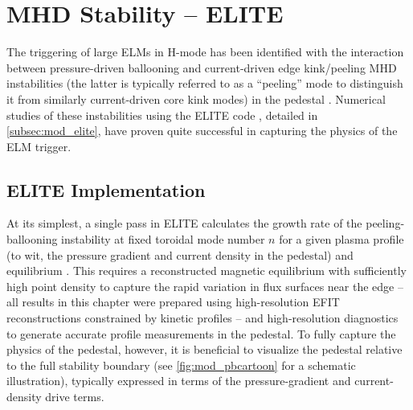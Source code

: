 \section{MHD Stability -- ELITE}\label{sec:imode_elite}

The triggering of large ELMs in H-mode has been identified with the interaction between pressure-driven ballooning and current-driven edge kink/peeling MHD instabilities (the latter is typically referred to as a ``peeling'' mode to distinguish it from similarly current-driven core kink modes) in the pedestal \cite{Wilson2002,Snyder2004,Wilson2006}.  Numerical studies of these instabilities using the ELITE code \cite{Wilson2002,Snyder2003}, detailed in \cref{subsec:mod_elite}, have proven quite successful in capturing the physics of the ELM trigger.

\subsection{ELITE Implementation}\label{subsec:imode_elite_setup}

At its simplest, a single pass in ELITE calculates the growth rate of the peeling-ballooning instability at fixed toroidal mode number $n$ for a given plasma profile (to wit, the pressure gradient and current density in the pedestal) and equilibrium \cite{Snyder2013}.  This requires a reconstructed magnetic equilibrium with sufficiently high point density to capture the rapid variation in flux surfaces near the edge -- all results in this chapter were prepared using high-resolution EFIT \cite{Lao1985} reconstructions constrained by kinetic profiles -- and high-resolution diagnostics to generate accurate profile measurements in the pedestal.  To fully capture the physics of the pedestal, however, it is beneficial to visualize the pedestal relative to the full stability boundary (see \cref{fig:mod_pbcartoon} for a schematic illustration), typically expressed in terms of the pressure-gradient and current-density drive terms.  

